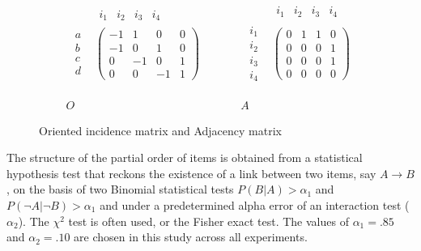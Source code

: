 \begin{figure}
\[
\begin{array}{ccccc}
\begin{array}{cc}
 & \begin{array}{cccc}
i_{1} & i_{2} & i_{3} & i_{4}\end{array}\\
\begin{array}{c}
a\\
b\\
c\\
d
\end{array} & \left(\begin{array}{cccc}
-1 & 1 & 0 & 0\\
-1 & 0 & 1 & 0\\
0 & -1 & 0 & 1\\
0 & 0 & -1 & 1
\end{array}\right)
\end{array} &  &  &  & \begin{array}{cc}
 & \begin{array}{cccc}
i_{1} & i_{2} & i_{3} & i_{4}\end{array}\\
\begin{array}{c}
i_{1}\\
i_{2}\\
i_{3}\\
i_{4}
\end{array} & \left(\begin{array}{cccc}
0 & 1 & 1 & 0\\
0 & 0 & 0 & 1\\
0 & 0 & 0 & 1\\
0 & 0 & 0 & 0
\end{array}\right)
\end{array}\\
\\
\\
O &  &  &  & A
\end{array}
\]


\caption{Oriented incidence matrix and Adjacency matrix}
\label{fig3IMAM}
\end{figure}


The structure of the partial order of items is obtained from a statistical hypothesis test that reckons the existence of a link between two items, say $A \rightarrow B$, on the basis of two Binomial statistical tests $P(B|A) > \alpha_1$ and $P(\neg A|\neg B) > \alpha_1$ and under a predetermined alpha error of an interaction test ($\alpha_2$).  The $\chi^2$ test is often used, or the Fisher exact test.  The values of $\alpha_1 = .85$ and $\alpha_2 = .10$ are chosen in this study across all experiments.

